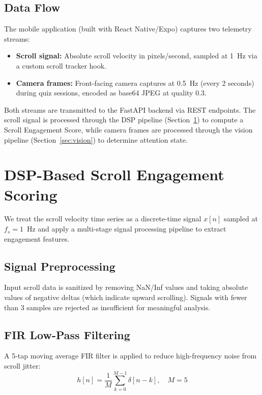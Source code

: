 \documentclass[conference]{IEEEtran}
\begin{document}
\subsection{Data Flow}

The mobile application (built with React Native/Expo) captures two telemetry streams:
\begin{itemize}
    \item \textbf{Scroll signal:} Absolute scroll velocity in pixels/second, sampled at 1~Hz via a custom scroll tracker hook.
    \item \textbf{Camera frames:} Front-facing camera captures at 0.5~Hz (every 2 seconds) during quiz sessions, encoded as base64 JPEG at quality 0.3.
\end{itemize}

Both streams are transmitted to the FastAPI backend via REST endpoints. The scroll signal is processed through the DSP pipeline (Section~\ref{sec:dsp}) to compute a Scroll Engagement Score, while camera frames are processed through the vision pipeline (Section~\ref{sec:vision}) to determine attention state.

\section{DSP-Based Scroll Engagement Scoring}
\label{sec:dsp}

We treat the scroll velocity time series as a discrete-time signal $x[n]$ sampled at $f_s = 1$~Hz and apply a multi-stage signal processing pipeline to extract engagement features.

\subsection{Signal Preprocessing}

Input scroll data is sanitized by removing NaN/Inf values and taking absolute values of negative deltas (which indicate upward scrolling). Signals with fewer than 3 samples are rejected as insufficient for meaningful analysis.

\subsection{FIR Low-Pass Filtering}

A 5-tap moving average FIR filter is applied to reduce high-frequency noise from scroll jitter:
\begin{equation}
h[n] = \frac{1}{M} \sum_{k=0}^{M-1} \delta[n-k], \quad M = 5
\label{eq:fir}
\end{equation}
\end{document}
